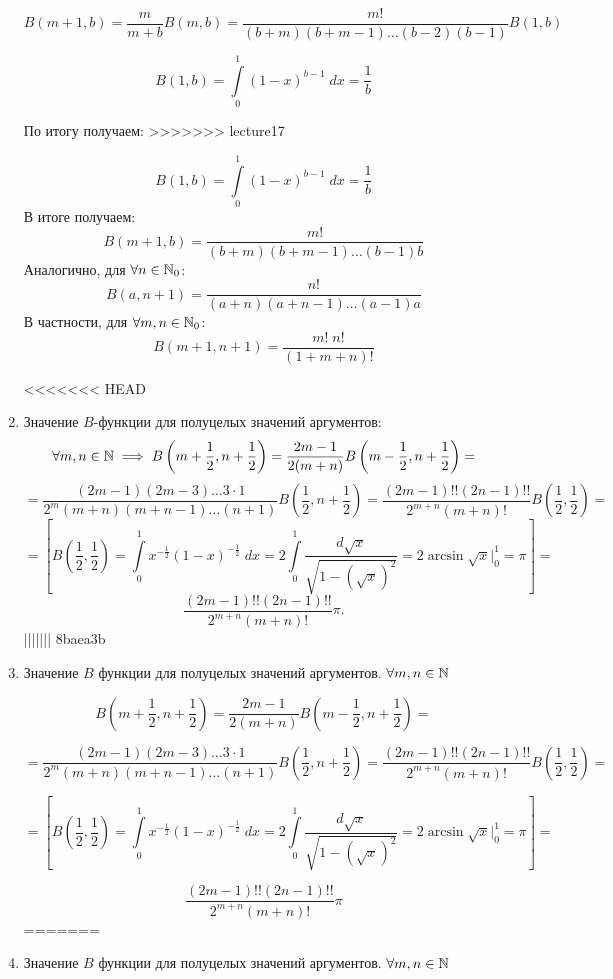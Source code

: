 \documentclass[../../main.tex]{subfiles}
\begin{document}
\begin{enumerate}
	\[  B(m+1,b) = \frac{m}{m+b} B(m,b) = \frac{m!}{(b+m)(b+m-1)\dots(b-2)(b-1)} 
	B(1,b)  \]
	
	\[ B(1,b) = \int\limits_{0}^{1} \left( 1-x \right) ^{b-1} \; dx = \frac{1}{b} 
	\]
	
	По итогу получаем:
>>>>>>> lecture17
	
	\[ B(1,b) = \int\limits_{0}^{1} \left( 1-x \right) ^{b-1} \; dx = \frac{1}{b} 
	\]
	В итоге получаем:
	\[  B(m+1,b) = \frac{m!}{(b+m)(b+m-1)\dots(b-1)b}     \]
	Аналогично, для $\forall n \in \mathbb{N}_0$:
	\[  B(a,n+1) = \frac{n!}{(a+n)(a+n-1)\dots(a-1)a}  \]
	В частности, для $\forall m,n \in \mathbb{N}_0$:
	\[  B(m+1,n+1) = \frac{m! \; n!}{(1+m+n)!}   \]
	
<<<<<<< HEAD
	\item Значение $B$-функции для полуцелых значений аргументов:
	\[  \forall m,n \in \mathbb{N} \implies B\left( m+\frac{1}{2}, n+\frac{1}{2} \right) 
	= \frac{2m - 1}{2(m+n)} 
	B\left( m-\frac{1}{2}, n+\frac{1}{2} \right) = \]
	\[ = \frac{(2m-1)(2m-3) \dots 3 \cdot 1}{2^m (m+n)(m+n-1)\dots (n+1)} B\left( 
	\frac{1}{2}, n+\frac{1}{2} \right) = \frac{(2m-1)!! (2n-1)!! }{2^{m+n} 
	(m+n)!} B\left( \frac{1}{2}, \frac{1}{2} \right) =  \]
	\[ = \left[  B\left( \frac{1}{2}, \frac{1}{2} \right) = \int\limits_{0}^{1} 
	x^{-\frac{1}{2}} \left( 1-x \right)^{-\frac{1}{2}} \; dx = 2 
	\int\limits_{0}^{1} \frac{d \sqrt{x} }{\sqrt{1 - \left(\sqrt{x} \right)^2 }} 
	= 2 \arcsin{\sqrt{x}} \Big|_{0}^{1} = \pi  \right] =     \]
	\[   \frac{(2m-1)!! (2n-1)!! }{2^{m+n} (m+n)!} \pi. \]
||||||| 8baea3b
	\item Значение $B$ функции для полуцелых значений аргументов. $\forall m,n \in \mathbb{N}$
		
	\[  B\left( m+\frac{1}{2}, n+\frac{1}{2} \right) = \frac{2m - 1}{2(m+n)} B\left( m-\frac{1}{2}, n+\frac{1}{2} \right) = \]
	
	\[ = \frac{(2m-1)(2m-3) \dots 3 \cdot 1}{2^m (m+n)(m+n-1)\dots (n+1)} B\left( \frac{1}{2}, n+\frac{1}{2} \right) = \frac{(2m-1)!! (2n-1)!! }{2^{m+n} (m+n)!} B\left( \frac{1}{2}, \frac{1}{2} \right) =  \]
	
	\[ = \left[  B\left( \frac{1}{2}, \frac{1}{2} \right) = \int\limits_{0}^{1} x^{-\frac{1}{2}} \left( 1-x \right)^{-\frac{1}{2}} \; dx = 2 \int\limits_{0}^{1} \frac{d \sqrt{x} }{\sqrt{1 - \left(\sqrt{x} \right)^2 }} = 2 \arcsin{\sqrt{x}} \bigg|_{0}^{1} = \pi  \right] =     \]
	
	\[   \frac{(2m-1)!! (2n-1)!! }{2^{m+n} (m+n)!} \pi    \]
=======
	\item Значение $B$ функции для полуцелых значений аргументов. $\forall m,n 
	\in \mathbb{N}$
		

\end{enumerate}
\end{document}
